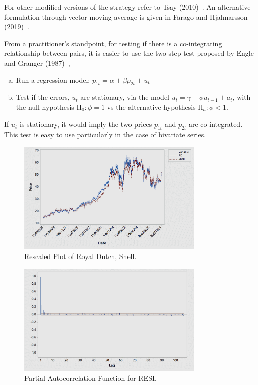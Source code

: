 \noindent For other modified versions of the strategy refer to Tsay (2010)~\cite[Section 8.8]{tsay}. An alternative formulation through vector moving average is given in Farago and Hjalmarsson (2019)~\cite{hjal}. 


From a practitioner's standpoint, for testing if there is a co-integrating relationship between pairs, it is easier to use the two-step test proposed by Engle and Granger (1987)~\cite{engle1987co},
        \begin{enumerate}[(a)]
        \item Run a regression model: $p_{1t}= \alpha + \beta p_{2t} + u_t$
        \item Test if the errors, $u_t$ are stationary, via the model $u_t=\gamma + \phi u_{t-1} + a_t$, with the null hypothesis $\text{H}_0: \phi= 1$ vs  the alternative hypothesis $\text{H}_a: \phi<1$.
        \end{enumerate}
If $u_t$ is stationary, it would imply the two prices $p_{1t}$ and $p_{2t}$ are co-integrated. This test is easy to use particularly in the case of bivariate series.

	\begin{figure}[!ht]
	\centering
	\includegraphics[width=0.8\textwidth]{chapters/chapter_stat_ts/figures/rds.png}
	\caption{Rescaled Plot of Royal Dutch, Shell. \label{fig:rds}}
	\end{figure}
	
	\begin{figure}[!ht]
	\centering
	\includegraphics[width=0.8\textwidth]{chapters/chapter_stat_ts/figures/pafresi.png}
	\caption{Partial Autocorrelation Function for RESI. \label{fig:pafresi}}
	\end{figure}
	
